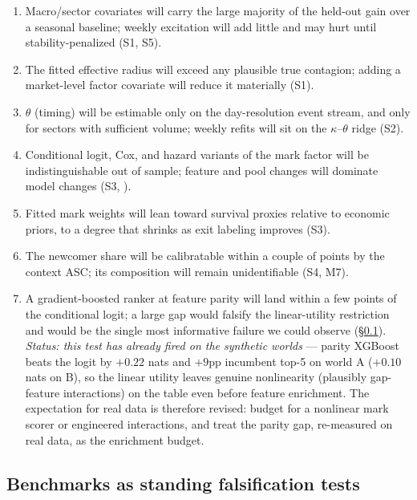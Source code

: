 \begin{enumerate}[leftmargin=1.6em]
\item Macro/sector covariates will carry the large majority of the held-out
gain over a seasonal baseline; weekly excitation will add little and may hurt
until stability-penalized (S1, S5).
\item The fitted effective radius will exceed any plausible true contagion;
adding a market-level factor covariate will reduce it materially (S1).
\item $\theta$ (timing) will be estimable only on the day-resolution event
stream, and only for sectors with sufficient volume; weekly refits will sit on
the $\kappa$--$\theta$ ridge (S2).
\item Conditional logit, Cox, and hazard variants of the mark factor will be
indistinguishable out of sample; feature and pool changes will dominate model
changes (S3, ).
\item Fitted mark weights will lean toward survival proxies relative to
economic priors, to a degree that shrinks as exit labeling improves (S3).
\item The newcomer share will be calibratable within a couple of points by the
context ASC; its composition will remain unidentifiable (S4, M7).
\item A gradient-boosted ranker at feature parity will land within a few
points of the conditional logit; a large gap would falsify the linear-utility
restriction and would be the single most informative failure we could observe
(\S\ref{sec:design_bench}). \emph{Status: this test has already fired on the
synthetic worlds} --- parity XGBoost beats the logit by $+0.22$ nats and
$+9$pp incumbent top-5 on world A ($+0.10$ nats on B), so the linear utility
leaves genuine nonlinearity (plausibly gap-feature interactions) on the table
even before feature enrichment. The expectation for real data is therefore
revised: budget for a nonlinear mark scorer or engineered interactions, and
treat the parity gap, re-measured on real data, as the enrichment budget.
\end{enumerate}

\subsection{Benchmarks as standing falsification tests}
\label{sec:design_bench}

